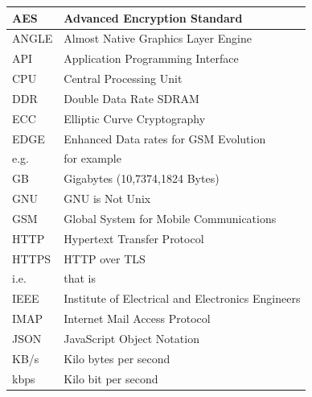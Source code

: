 \documentclass[11pt,a4paper]{article}
\begin{document}
\begin{subappendices}
\begin{center}
\begin{longtable}{|p{3cm}|p{9.1cm}|}
                    \endfoot

                    \hline
                    \endlastfoot

                    AES          & Advanced Encryption Standard\\
                    \hline
                    ANGLE        & Almost Native Graphics Layer Engine\\
                    \hline
                    API          & Application Programming Interface\\
                    \hline
                    CPU          & Central Processing Unit\\
                    \hline
                    DDR          & Double Data Rate SDRAM\\
                    \hline
                    ECC          & Elliptic Curve Cryptography\\
                    \hline
                    EDGE         & Enhanced Data rates for GSM Evolution\\
                    \hline
                    e.g.         & for example\\
                    \hline
                    GB           & Gigabytes (10,7374,1824 Bytes)\\
                    \hline
                    GNU          & GNU is Not Unix\\
                    \hline
                    GSM          & Global System for Mobile Communications\\
                    \hline
                    HTTP         & Hypertext Transfer Protocol\\
                    \hline
                    HTTPS        & HTTP over TLS\\
                    \hline
                    i.e.         & that is\\
                    \hline
                    IEEE         & Institute of Electrical and Electronics Engineers\\
                    \hline
                    IMAP         & Internet Mail Access Protocol\\
                    \hline
                    JSON         & JavaScript Object Notation\\
                    \hline
                    KB/s         & Kilo bytes per second\\
                    \hline
                    kbps         & Kilo bit per second\\

\end{longtable}
\end{center}
\end{subappendices}
\end{document}
